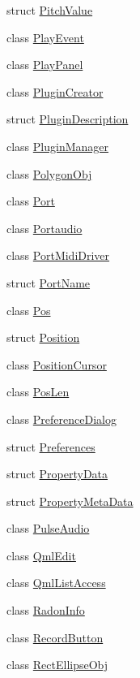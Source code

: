 \begin{DoxyCompactItemize}
struct \hyperlink{struct_ms_1_1_pitch_value}{Pitch\+Value}
\item 
class \hyperlink{class_ms_1_1_play_event}{Play\+Event}
\item 
class \hyperlink{class_ms_1_1_play_panel}{Play\+Panel}
\item 
class \hyperlink{class_ms_1_1_plugin_creator}{Plugin\+Creator}
\item 
struct \hyperlink{struct_ms_1_1_plugin_description}{Plugin\+Description}
\item 
class \hyperlink{class_ms_1_1_plugin_manager}{Plugin\+Manager}
\item 
class \hyperlink{class_ms_1_1_polygon_obj}{Polygon\+Obj}
\item 
class \hyperlink{class_ms_1_1_port}{Port}
\item 
class \hyperlink{class_ms_1_1_portaudio}{Portaudio}
\item 
class \hyperlink{class_ms_1_1_port_midi_driver}{Port\+Midi\+Driver}
\item 
struct \hyperlink{struct_ms_1_1_port_name}{Port\+Name}
\item 
class \hyperlink{class_ms_1_1_pos}{Pos}
\item 
struct \hyperlink{struct_ms_1_1_position}{Position}
\item 
class \hyperlink{class_ms_1_1_position_cursor}{Position\+Cursor}
\item 
class \hyperlink{class_ms_1_1_pos_len}{Pos\+Len}
\item 
class \hyperlink{class_ms_1_1_preference_dialog}{Preference\+Dialog}
\item 
struct \hyperlink{struct_ms_1_1_preferences}{Preferences}
\item 
struct \hyperlink{struct_ms_1_1_property_data}{Property\+Data}
\item 
struct \hyperlink{struct_ms_1_1_property_meta_data}{Property\+Meta\+Data}
\item 
class \hyperlink{class_ms_1_1_pulse_audio}{Pulse\+Audio}
\item 
class \hyperlink{class_ms_1_1_qml_edit}{Qml\+Edit}
\item 
class \hyperlink{class_ms_1_1_qml_list_access}{Qml\+List\+Access}
\item 
class \hyperlink{class_ms_1_1_radon_info}{Radon\+Info}
\item 
class \hyperlink{class_ms_1_1_record_button}{Record\+Button}
\item 
class \hyperlink{class_ms_1_1_rect_ellipse_obj}{Rect\+Ellipse\+Obj}
\item 

\end{DoxyCompactItemize}
